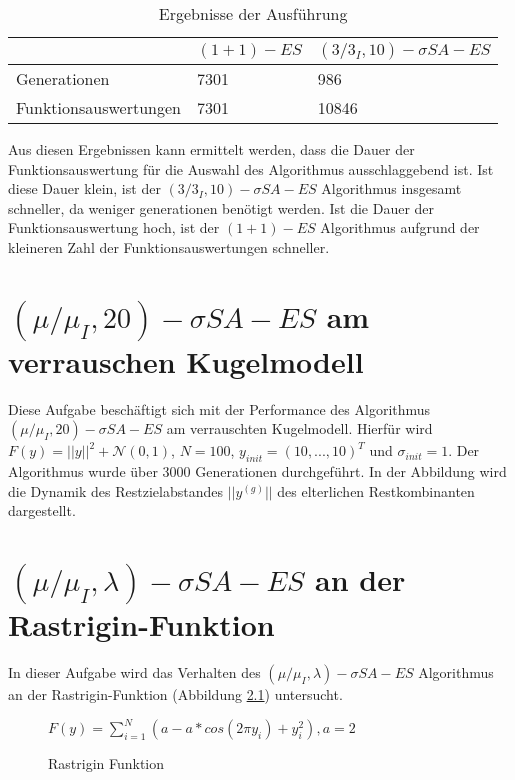 \begin{table}[h]
  \begin{center}
  \begin{tabular}{|l|p{5cm}|p{5cm}|}
    \hline
     & $(1+1)-ES$ & $(3/3_I,10)-\sigma SA-ES$ \\
    \hline
    Generationen & 7301 & 986 \\
    \hline
    Funktionsauswertungen & 7301 & 10846 \\
    \hline
  \end{tabular}
  \caption{Ergebnisse der Ausführung}
  \end{center}
\end{table}

Aus diesen Ergebnissen kann ermittelt werden, dass die Dauer der Funktionsauswertung für die Auswahl des Algorithmus ausschlaggebend ist. Ist diese Dauer klein, ist der $(3/3_I,10)-\sigma SA-ES$ Algorithmus insgesamt schneller, da weniger generationen benötigt werden. Ist die Dauer der Funktionsauswertung hoch, ist der $(1+1)-ES$ Algorithmus aufgrund der kleineren Zahl der Funktionsauswertungen schneller.

\chapter{$(\mu/\mu_I,20)-\sigma SA-ES$ am verrauschen Kugelmodell}

Diese Aufgabe beschäftigt sich mit der Performance des Algorithmus $(\mu/\mu_I,20)-\sigma SA-ES$ am verrauschten Kugelmodell. Hierfür wird $F(y)=||y||^2+\mathcal{N}(0,1)$, $N=100$, $y_{init}=(10,...,10)^T$ und $\sigma_{init}=1$.
Der Algorithmus wurde über 3000 Generationen durchgeführt. In der Abbildung  wird die Dynamik des Restzielabstandes $||y^{(g)}||$ des elterlichen Restkombinanten dargestellt.



\chapter{$(\mu/\mu_I,\lambda)-\sigma SA-ES$ an der Rastrigin-Funktion}

In dieser Aufgabe wird das Verhalten des $(\mu/\mu_I,\lambda)-\sigma SA-ES$ Algorithmus an der Rastrigin-Funktion (Abbildung \ref{fig:rastrigin}) untersucht.

\begin{figure}[h]
  \label{fig:rastrigin}
  \begin{center}
  
    $F(y)=\sum_{i=1}^N(a-a*cos(2\pi y_i)+y_i^2), a=2$
    
    \caption{Rastrigin Funktion}
  \end{center}
\end{figure}


